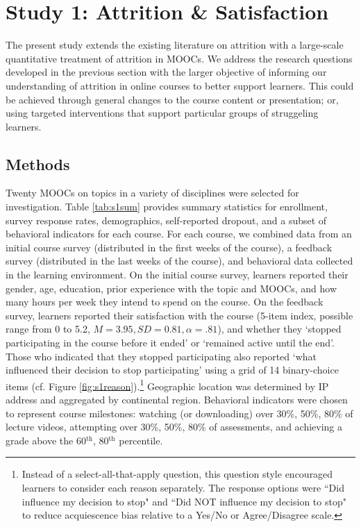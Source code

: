 \documentclass{sigchi}\usepackage[]{graphicx}\usepackage[]{color}
\begin{document}
\section{Study 1: Attrition \& Satisfaction}

The present study extends the existing literature on attrition with a large-scale quantitative treatment of attrition in MOOCs. We address the research questions developed in the previous section with the larger objective of informing our understanding of attrition in online courses to better support learners. This could be achieved through general changes to the course content or presentation; or, using targeted interventions that support particular groups of struggeling learners.

\subsection{Methods}

Twenty MOOCs on topics in a variety of disciplines were selected for investigation. Table \ref{tab:s1sum} provides summary statistics for enrollment, survey response rates, demographics, self-reported dropout, and a subset of behavioral indicators for each course. For each course, we combined data from an initial course survey (distributed in the first weeks of the course), a feedback survey (distributed in the last weeks of the course), and behavioral data collected in the learning environment. On the initial course survey, learners reported their gender, age, education, prior experience with the topic and MOOCs, and how many hours per week they intend to spend on the course. On the feedback survey, learners reported their satisfaction with the course (5-item index, possible range from 0 to 5.2, $M=3.95, SD=0.81, \alpha=.81$), and whether they `stopped participating in the course before it ended' or `remained active until the end'. Those who indicated that they stopped participating also reported `what influenced their decision to stop participating' using a grid of 14 binary-choice items (cf. Figure \ref{fig:s1reason}).\footnote{Instead of a select-all-that-apply question, this question style encouraged learners to consider each reason separately. The response options were ``Did influence my decision to stop" and ``Did NOT influence my decision to stop" to reduce acquiescence bias relative to a Yes/No or Agree/Disagree scale.} Geographic location was determined by IP address and aggregated by continental region. Behavioral indicators were chosen to represent course milestones: watching (or downloading) over 30\%, 50\%, 80\% of lecture videos, attempting over 30\%, 50\%, 80\% of assessments, and achieving a grade above the 60$^\text{th}$, 80$^\text{th}$ percentile. 
\end{document}
